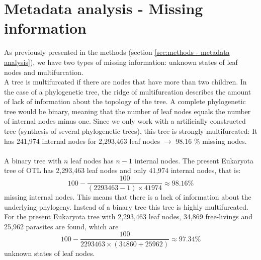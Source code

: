   \section{Metadata analysis - Missing information} \label{sec:results - missing information}
    As previously presented in the methods (section \ref{sec:methods - metadata analysis}), we have 
      two types of missing information: unknown states of leaf nodes and multifurcation. \\

    A tree is multifurcated if there are nodes that have more than two children. In the case of a 
      phylogenetic tree, the ridge of multifurcation describes the amount of lack of information about 
      the topology of the tree. A complete phylogenetic tree would be binary, meaning that the number 
      of leaf nodes equals the number of internal nodes minus one. Since we only work with a 
      artificially constructed tree (synthesis of several phylogenetic trees), this tree is strongly 
      multifurcated: It has 241,974 internal nodes for 2,293,463 leaf nodes $\rightarrow$ 98.16 \% 
      missing nodes. \\

       \\
      A binary tree with $n$ leaf nodes has $n-1$ internal nodes. The present Eukaryota tree of OTL has 
      2,293,463 leaf nodes and only 41,974 internal nodes, that is:
    $$100-\frac{100}{(2293463-1) \times 41974} \approx 98.16 \%$$
      missing internal nodes. This means that there is a lack of information about the underlying 
      phylogeny. Instead of a binary tree this tree is highly multifurcated. \\


    For the present Eukaryota tree with 2,293,463 leaf nodes, 34,869 free-livings and 25,962 parasites 
      are found, which are
      $$100-\frac{100}{2293463 \times (34860+25962)} \approx 97.34 \%$$
      unknown states of leaf nodes. \\
    \todo{-----} \\

